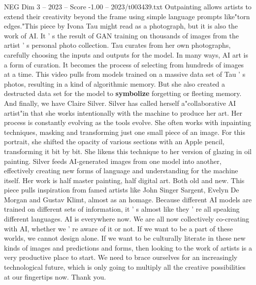 \begin{textsample}{NEG Dim 3 – 2023 – Score -1.00 – 2023/t003439.txt}
Outpainting allows artists to extend their creativity beyond the frame using simple language prompts like"torn edges."This piece by Ivona Tau might read as a photograph, but it is also the work of AI.
It ' s the result of GAN training on thousands of images from the artist ' s personal photo collection.
Tau curates from her own photographs, carefully choosing the inputs and outputs for the model.
In many ways, AI art is a form of curation.
It becomes the process of selecting from hundreds of images at a time.
This video pulls from models trained on a massive data set of Tau ' s photos, resulting in a kind of algorithmic memory.
But she also created a destructed data set for the model to \textbf{symbolize} forgetting or fleeting memory.
And finally, we have Claire Silver.
Silver has called herself a"collaborative AI artist"in that she works intentionally with the machine to produce her art.
Her process is constantly evolving as the tools evolve.
She often works with inpainting techniques, masking and transforming just one small piece of an image.
For this portrait, she shifted the opacity of various sections with an Apple pencil, transforming it bit by bit.
She likens this technique to her version of glazing in oil painting.
Silver feeds AI-generated images from one model into another, effectively creating new forms of language and understanding for the machine itself.
Her work is half master painting, half digital art.
Both old and new.
This piece pulls inspiration from famed artists like John Singer Sargent, Evelyn De Morgan and Gustav Klimt, almost as an homage.
Because different AI models are trained on different sets of information, it ' s almost like they ' re all speaking different languages.
AI is everywhere now.
We are all now collectively co-creating with AI, whether we ' re aware of it or not.
If we want to be a part of these worlds, we cannot design alone.
If we want to be culturally literate in these new kinds of images and predictions and forms, then looking to the work of artists is a very productive place to start.
We need to brace ourselves for an increasingly technological future, which is only going to multiply all the creative possibilities at our fingertips now.
Thank you.

\end{textsample}
